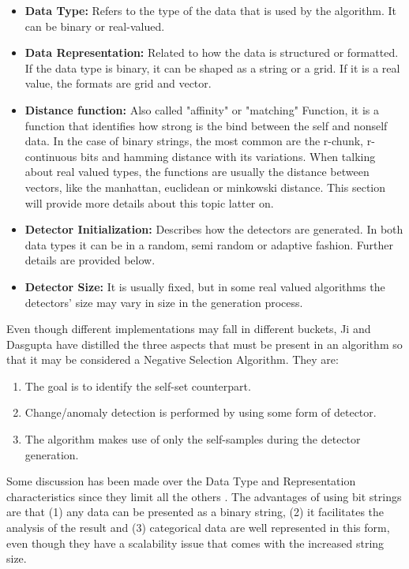 \begin{itemize}
    \item \textbf{Data Type:} Refers to the type of the data that is used by the algorithm. It can be binary or real-valued.
    
    \item \textbf{Data Representation:} Related to how the data is structured or formatted. If the data type is binary, it can be shaped as a string or a grid. If it is a real value, the formats are grid and vector. 
    
    \item \textbf{Distance function:} Also called "affinity" or "matching" Function, it is a function that identifies how strong is the bind between the self and nonself data. In the case of binary strings, the most common are the r-chunk, r-continuous bits and hamming distance with its variations. When talking about real valued types, the functions are usually the distance between vectors, like the manhattan, euclidean or minkowski distance. This section will provide more details about this topic latter on.
    
    \item \textbf{Detector Initialization:} Describes how the detectors are generated. In both data types it can be in a random, semi random or adaptive fashion. Further details are provided below.
    
    \item \textbf{Detector Size:} It is usually fixed, but in some real valued algorithms the detectors' size may vary in size in the generation process.
    
\end{itemize}


Even though different implementations may fall in different buckets, Ji and Dasgupta \cite{RevisitingNSA2007} have distilled the three aspects that must be present in an algorithm so that it may be considered a Negative Selection Algorithm. They are:
\begin{enumerate}
    \item The goal is to identify the self-set counterpart.
    \item Change/anomaly detection is performed by using some form of detector. 
    \item The algorithm makes use of only the self-samples during the detector generation.
\end{enumerate}

Some discussion has been made over the Data Type and Representation characteristics since they limit all the others \cite{RevisitingNSA2007} \cite{NSAResearch2021} \cite{ICBook2009}. The advantages of using bit strings are that (1) any data can be presented as a binary string, (2) it facilitates the analysis of the result and (3) categorical data are well represented in this form, even though they have a scalability issue that comes with the increased string size. 

